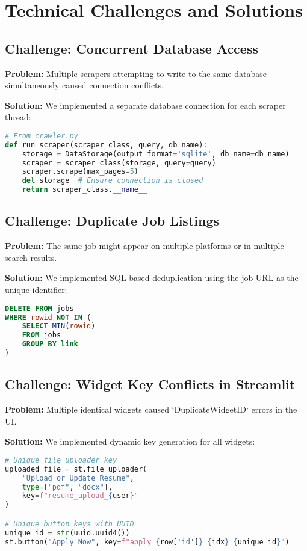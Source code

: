 \documentclass[12pt,a4paper]{article}
\begin{document}
\section{Technical Challenges and Solutions}

\subsection{Challenge: Concurrent Database Access}
\textbf{Problem:} Multiple scrapers attempting to write to the same database simultaneously caused connection conflicts.

\textbf{Solution:} We implemented a separate database connection for each scraper thread:

\begin{lstlisting}[language=Python, caption=Independent Database Connections]
# From crawler.py
def run_scraper(scraper_class, query, db_name):
    storage = DataStorage(output_format='sqlite', db_name=db_name)
    scraper = scraper_class(storage, query=query)
    scraper.scrape(max_pages=5)
    del storage  # Ensure connection is closed
    return scraper_class.__name__
\end{lstlisting}

\subsection{Challenge: Duplicate Job Listings}
\textbf{Problem:} The same job might appear on multiple platforms or in multiple search results.

\textbf{Solution:} We implemented SQL-based deduplication using the job URL as the unique identifier:

\begin{lstlisting}[language=SQL, caption=Deduplication SQL]
DELETE FROM jobs
WHERE rowid NOT IN (
    SELECT MIN(rowid)
    FROM jobs
    GROUP BY link
)
\end{lstlisting}

\subsection{Challenge: Widget Key Conflicts in Streamlit}
\textbf{Problem:} Multiple identical widgets caused `DuplicateWidgetID` errors in the UI.

\textbf{Solution:} We implemented dynamic key generation for all widgets:

\begin{lstlisting}[language=Python, caption=Dynamic Widget Keys]
# Unique file uploader key
uploaded_file = st.file_uploader(
    "Upload or Update Resume", 
    type=["pdf", "docx"], 
    key=f"resume_upload_{user}"
)

# Unique button keys with UUID
unique_id = str(uuid.uuid4())
st.button("Apply Now", key=f"apply_{row['id']}_{idx}_{unique_id}")
\end{lstlisting}
\end{document}
